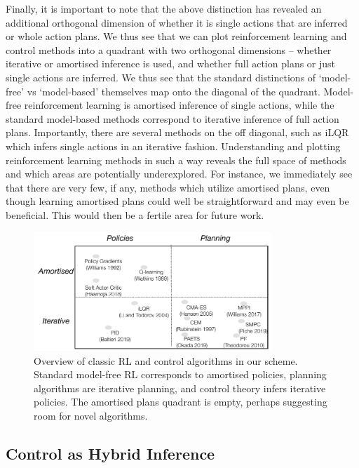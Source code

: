 Finally, it is important to note that the above distinction has revealed an additional orthogonal dimension of whether it is single actions that are inferred or whole action plans. We thus see that we can plot reinforcement learning and control methods into a quadrant with two orthogonal dimensions -- whether iterative or amortised inference is used, and whether full action plans or just single actions are inferred. We thus see that the standard distinctions of `model-free' vs `model-based' themselves map onto the diagonal of the quadrant. Model-free reinforcement learning is amortised inference of single actions, while the standard model-based methods correspond to iterative inference of full action plans. Importantly, there are several methods on the off diagonal, such as iLQR \citep{li2004iterative} which infers single actions in an iterative fashion. Understanding and plotting reinforcement learning methods in such a way reveals the full space of methods and which areas are potentially underexplored. For instance, we immediately see that there are very few, if any, methods which utilize amortised plans, even though learning amortised plans could well be straightforward and may even be beneficial. This would then be a fertile area for future work.

\begin{figure}
    \begin{center}
          \includegraphics[width=0.8\textwidth]{chapter_4_figures/quadrant_prelim_2.pdf}
    \end{center}
    \caption{Overview of classic RL and control algorithms in our scheme. Standard model-free RL corresponds to amortised policies, planning algorithms are iterative planning, and control theory infers iterative policies. The amortised plans quadrant is empty, perhaps suggesting room for novel algorithms.}
    \label{fig:quad}
\end{figure}


\subsection{Control as Hybrid Inference}

